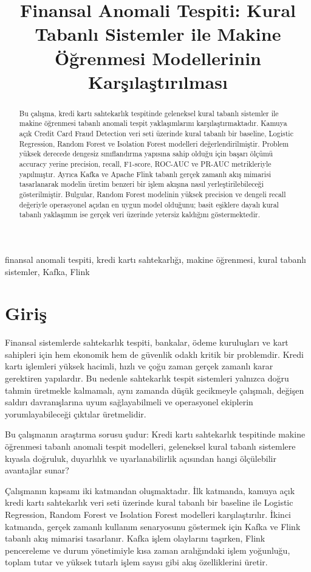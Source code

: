 \documentclass[conference]{IEEEtran}
\title{Finansal Anomali Tespiti: Kural Tabanlı Sistemler ile Makine Öğrenmesi Modellerinin Karşılaştırılması}
\author{
\IEEEauthorblockN{Alper Özarslan}
\IEEEauthorblockA{
Öğrenci Numarası: 0414230022\\
İstanbul Üniversitesi, Fen Fakültesi, Bilgisayar Bilimleri Bölümü\\
Yapay Zeka Dersi Araştırma Ödevi
}
}
\begin{document}
\maketitle

\begin{abstract}
Bu çalışma, kredi kartı sahtekarlık tespitinde geleneksel kural tabanlı sistemler ile makine öğrenmesi tabanlı anomali tespit yaklaşımlarını karşılaştırmaktadır. Kamuya açık Credit Card Fraud Detection veri seti üzerinde kural tabanlı bir baseline, Logistic Regression, Random Forest ve Isolation Forest modelleri değerlendirilmiştir. Problem yüksek derecede dengesiz sınıflandırma yapısına sahip olduğu için başarı ölçümü accuracy yerine precision, recall, F1-score, ROC-AUC ve PR-AUC metrikleriyle yapılmıştır. Ayrıca Kafka ve Apache Flink tabanlı gerçek zamanlı akış mimarisi tasarlanarak modelin üretim benzeri bir işlem akışına nasıl yerleştirilebileceği gösterilmiştir. Bulgular, Random Forest modelinin yüksek precision ve dengeli recall değeriyle operasyonel açıdan en uygun model olduğunu; basit eşiklere dayalı kural tabanlı yaklaşımın ise gerçek veri üzerinde yetersiz kaldığını göstermektedir.
\end{abstract}

\begin{IEEEkeywords}
finansal anomali tespiti, kredi kartı sahtekarlığı, makine öğrenmesi, kural tabanlı sistemler, Kafka, Flink
\end{IEEEkeywords}

\section{Giriş}

Finansal sistemlerde sahtekarlık tespiti, bankalar, ödeme kuruluşları ve kart sahipleri için hem ekonomik hem de güvenlik odaklı kritik bir problemdir. Kredi kartı işlemleri yüksek hacimli, hızlı ve çoğu zaman gerçek zamanlı karar gerektiren yapılardır. Bu nedenle sahtekarlık tespit sistemleri yalnızca doğru tahmin üretmekle kalmamalı, aynı zamanda düşük gecikmeyle çalışmalı, değişen saldırı davranışlarına uyum sağlayabilmeli ve operasyonel ekiplerin yorumlayabileceği çıktılar üretmelidir.

Bu çalışmanın araştırma sorusu şudur: Kredi kartı sahtekarlık tespitinde makine öğrenmesi tabanlı anomali tespit modelleri, geleneksel kural tabanlı sistemlere kıyasla doğruluk, duyarlılık ve uyarlanabilirlik açısından hangi ölçülebilir avantajlar sunar?

Çalışmanın kapsamı iki katmandan oluşmaktadır. İlk katmanda, kamuya açık kredi kartı sahtekarlık veri seti üzerinde kural tabanlı bir baseline ile Logistic Regression, Random Forest ve Isolation Forest modelleri karşılaştırılır. İkinci katmanda, gerçek zamanlı kullanım senaryosunu göstermek için Kafka ve Flink tabanlı akış mimarisi tasarlanır. Kafka işlem olaylarını taşırken, Flink pencereleme ve durum yönetimiyle kısa zaman aralığındaki işlem yoğunluğu, toplam tutar ve yüksek tutarlı işlem sayısı gibi akış özelliklerini üretir.
\end{document}
